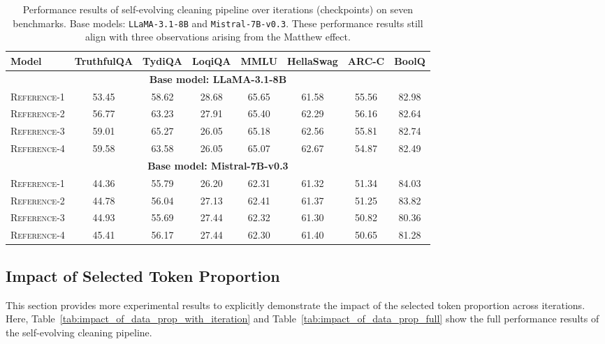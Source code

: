 \begin{table*}[ht]
\centering
\caption{Performance results of self-evolving cleaning pipeline over iterations (checkpoints) on seven benchmarks. Base models: \texttt{LLaMA-3.1-8B} and \texttt{Mistral-7B-v0.3}. These performance results still align with three observations arising from the Matthew effect.}
\vspace{1ex}
\begin{tabular}{l|ccccccc}
\toprule
\textbf{Model} 
& \textbf{TruthfulQA} 
& \textbf{TydiQA} 
& \textbf{LoqiQA} 
& \textbf{MMLU} 
& \textbf{HellaSwag} 
& \textbf{ARC-C} 
& \textbf{BoolQ} \\
\midrule
\multicolumn{8}{c}{\cellcolor{blue!10} \textbf{Base model: LLaMA-3.1-8B}} \\
\midrule
\textsc{Reference-1} 
 & 53.45 & 58.62 & 28.68 & 65.65 & 61.58 & 55.56 & 82.98 \\
\textsc{Reference-2} 
& 56.77 & 63.23 & 27.91 & 65.40 & 62.29 & 56.16 & 82.64  \\
\textsc{Reference-3} 
& 59.01 & 65.27 & 26.05 & 65.18 & 62.56 & 55.81 & 82.74  \\
\textsc{Reference-4} 
& 59.58 & 63.58 & 26.05 & 65.07 & 62.67 & 54.87 & 82.49  \\
\midrule
\multicolumn{8}{c}{\cellcolor{blue!10} \textbf{Base model: Mistral-7B-v0.3}} \\

\midrule
\textsc{Reference-1} 
& 44.36 & 55.79 & 26.20 & 62.31 & 61.32 & 51.34 & 84.03 \\
\textsc{Reference-2} 
& 44.78 & 56.04 & 27.13 & 62.41 & 61.37 & 51.25 & 83.82  \\
\textsc{Reference-3} 
& 44.93 & 55.69 & 27.44 & 62.32 & 61.30 & 50.82 & 80.36 \\
\textsc{Reference-4}  
& 45.41 & 56.17 & 27.44 & 62.30 & 61.40 & 50.65 & 81.28  \\
\bottomrule
\end{tabular}
\label{tab:iteration_results_7b_and_8b}
\end{table*}


\subsection{Impact of Selected Token Proportion}

This section provides more experimental results to explicitly demonstrate the impact of the selected token proportion across iterations. Here, Table~\ref{tab:impact_of_data_prop_with_iteration} and Table~\ref{tab:impact_of_data_prop_full} show the full performance results of the self-evolving cleaning pipeline.



